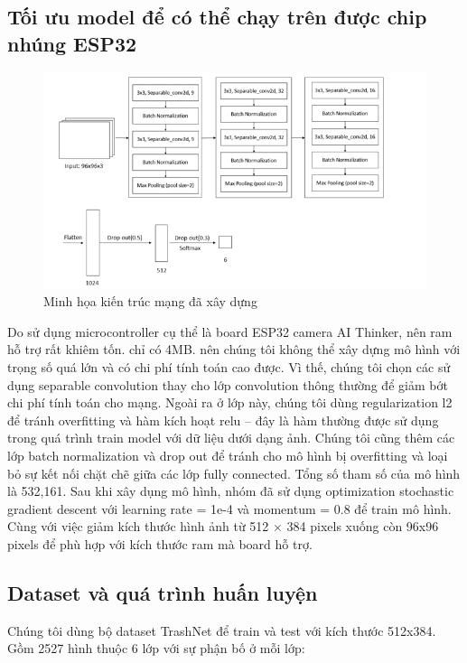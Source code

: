\subsection{Tối ưu model để có thể chạy trên được chip nhúng ESP32}
\begin{figure}[ht]
    \centering
    \includegraphics[width=\linewidth]{images/Quanh/ktmang.png}
    \caption{ Minh họa kiến trúc mạng đã xây dựng}
    \label{fig:kientrucmang}
\end{figure}

Do sử dụng microcontroller cụ thể là board ESP32 camera AI Thinker, nên ram hỗ trợ rất khiêm tốn. chỉ có 4MB. nên chúng tôi không thể xây dựng mô hình với trọng số quá lớn và có chi phí tính toán cao được. Vì thế, chúng tôi chọn các sử dụng separable convolution thay cho lớp convolution thông thường để giảm bớt chi phí tính toán cho mạng. Ngoài ra ở lớp này, chúng tôi dùng regularization l2 để tránh overfitting và hàm kích hoạt relu – đây là hàm thường được sử dụng trong quá trình train model với dữ liệu dưới dạng ảnh. Chúng tôi cũng thêm các lớp batch normalization và drop out để tránh cho mô hình bị overfitting và loại bỏ sự kết nối chặt chẽ giữa các lớp fully connected. Tổng số tham số của mô hình là 532,161. Sau khi xây dụng mô hình, nhóm đã sử dụng optimization stochastic gradient descent với learning rate = 1e-4 và momentum = 0.8 để train mô hình. Cùng với việc giảm kích thước hình ảnh từ 512 × 384 pixels xuống còn 96x96 pixels để phù hợp với kích thước ram mà board hỗ trợ.

\subsection{Dataset và quá trình huấn luyện} %
Chúng tôi dùng bộ dataset TrashNet \cite{trashnet} để train và test với kích thước 512x384.
Gồm 2527 hình thuộc 6 lớp với sự phận bố ở mỗi lớp:
 
